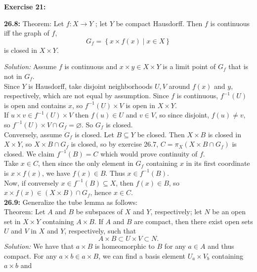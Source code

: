 \documentclass[a4paper]{article}
\begin{document}
        \textbf{Exercise 21:} 

        \textbf{26.8:} Theorem: Let $f \colon X \to Y$ ; let $Y$ be compact
        Hausdorff. Then $f$ is continuous iff the graph of $f$,
        \[
        G_f = \left\{ x \times f(x)  \mid x \in X \right\} 
        \] 
        is closed in $X \times Y$.

        \textit{Solution:} Assume $f$ is continuous and $x \times y \in
        X \times Y$ is a limit point of $G_f$ that is not in $G_f$.\\
        Since $Y$ is Hausdorff, take disjoint neighborhoods $U,V$ around 
        $f(x)$ and $y$, respectively, which are not equal by assumption. Since $f$ is
        continuous, $f^{-1}(U)$ is open and contains $x$, so
        $f^{-1}(U) \times V$ is open in $X \times Y$. \\
        If $u \times v \in f^{-1}(U) \times V$ then $f(u) \in U$ and 
        $v \in V$, so since disjoint, $f(u)\neq v$, so $f^{-1}(U) \times V \cap
        G_f = \varnothing$. So $G_f$ is closed.\\
        Conversely, assume $G_f$ is closed. Let $B \subseteq Y$ be closed. Then
        $X \times B$ is closed in $X \times Y$, so
        $X \times B \cap G_f$ is closed, so by exercise 26.7, 
        $C= \pi_X \left( X \times B \cap G_f \right) $ is closed.
        We claim $f^{-1}(B) = C$ which would prove continuity of $f$.\\
        Take $x \in C$, then  since the only element in $G_f$ containing $x$ in
        its first coordinate is $x \times f(x)$, we have $f(x) \in B$.
        Thus $x \in f^{-1}(B)$.\\
        Now, if conversely $x \in f^{-1}(B) \subseteq X$, then $f(x) \in B$, so
        $x \times f(x) \in (X \times B) \cap G_f$, hence $x \in C$.\\
        \linebreak
        \textbf{26.9:} Generalize the tube lemma as follows:\\
        Theorem: Let $A$ and $B$ be subspaces of $X$ and $Y$, respectively; let
        $N$ be an open set in $X \times Y$ containing $A \times B$. If $A$ and
        $B$ are compact, then there exist open sets $U$ and $V$ in $X$ and $Y$,
        respectively, such that
        \[
        A \times B \subset U \times V \subset N.
        \] 
        \textit{Solution:} We have that $a \times B$ is homeomorphic to $B$ for
        any $a \in A$ and thus compact. For any $a\times b \in a \times B$, we
        can find a basis element $U_a \times V_{b}$ containing $a\times b$ and
\end{document}
